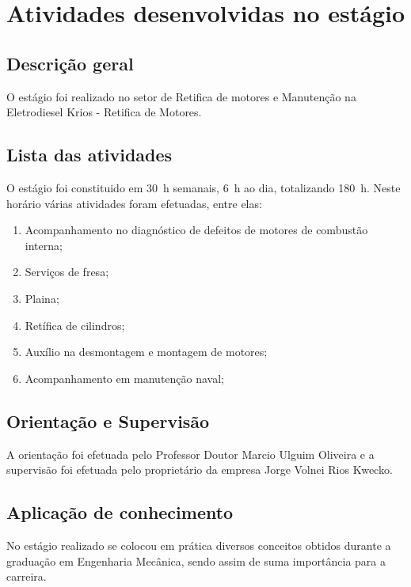 \chapter{Atividades desenvolvidas no estágio}\label{ch:desenvolvimento}

\section{Descrição geral}\label{sec:descgeral}

O estágio foi realizado no setor de Retifica de motores e Manutenção 
na Eletrodiesel Krios - Retifica de Motores.

\section{Lista das atividades}\label{sec:cronograma}

O estágio foi constituido em 30~h semanais, 6~h ao dia, totalizando
180~h. Neste horário várias atividades foram efetuadas, entre elas:

\begin{enumerate}
    \item Acompanhamento no diagnóstico de defeitos de motores de combustão interna;
    \item Serviços de fresa;
    \item Plaina;
    \item Retífica de cilindros;
    \item Auxílio na desmontagem e montagem de motores;
    \item Acompanhamento em manutenção naval;
\end{enumerate}

\section{Orientação e Supervisão}\label{sec:orientacao}

A orientação foi efetuada pelo Professor Doutor Marcio Ulguim Oliveira e a supervisão foi 
efetuada pelo proprietário da empresa Jorge Volnei Rios Kwecko.

\section{Aplicação de conhecimento}\label{sec:aplicacao}

No estágio realizado se colocou em prática diversos conceitos obtidos durante a 
graduação em Engenharia Mecânica, sendo assim de suma importância para a carreira.

